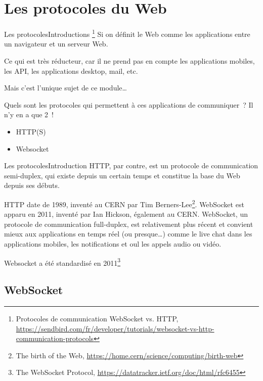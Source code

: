 \documentclass{beamer}
\begin{document}
    \section{Les protocoles du Web}\label{sec:protocoles}

    \begin{frame}{Les protocoles}{Introductions}
        \footnote{\label{sendbird-protocole}Protocoles de communication WebSocket vs. HTTP, \url{https://sendbird.com/fr/developer/tutorials/websocket-vs-http-communication-protocols}}
        Si on définit le Web comme les applications entre un navigateur et un serveur Web.
        \begin{dangercolorbox}
            Ce qui est très réducteur, car il ne prend pas en compte les applications mobiles, les API, les applications desktop, mail, etc.

            Mais c'est l'unique sujet de ce module\ldots
        \end{dangercolorbox}
        Quels sont les protocoles qui permettent à ces applications de communiquer~?
        \pause
        \bigbreak
        Il n'y en a que 2~!
        \begin{itemize}
            \item HTTP(S)
            \item Websocket
        \end{itemize}
    \end{frame}

    \begin{frame}{Les protocoles}{Introduction\label{sendbird-protocole}}
        HTTP, par contre, est un protocole de communication semi-duplex, qui existe depuis un certain temps et constitue la base du Web depuis ses débuts.

        HTTP date de 1989, inventé au CERN par Tim Berners-Lee\footnote{The birth of the Web, \url{https://home.cern/science/computing/birth-web}}. WebSocket est apparu en 2011, inventé par Ian Hickson, également au CERN.
        \bigbreak
        WebSocket, un protocole de communication full-duplex, est relativement plus récent et convient mieux aux applications en temps réel (ou presque\ldots) comme le live chat dans les applications mobiles, les notifications et oul les appels audio ou vidéo.

        Websocket a été standardisé en 2011\footnote{The WebSocket Protocol, \url{https://datatracker.ietf.org/doc/html/rfc6455}}
    \end{frame}

    \subsection{WebSocket}\label{subsec:websocket}
\end{document}
